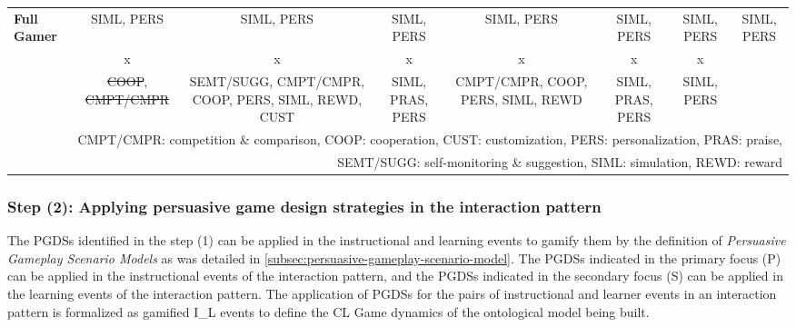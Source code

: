 \begin{landscape}
\begin{tabular}{|l|c|c|c|c|c|c|c|}
\multirow{3}{*}{\textbf{Full Gamer}}& 
\multicolumn{1}{|p{2.5cm}|}{\centering SIML, PERS}&%
\multicolumn{1}{|p{2.5cm}|}{\centering SIML, PERS}&%
\multicolumn{1}{|p{2.5cm}|}{\centering SIML, PERS}&%
\multicolumn{1}{|p{2.5cm}|}{\centering SIML, PERS}&%
\multicolumn{1}{|p{2.5cm}|}{\centering SIML, PERS}&%
\multicolumn{1}{|p{2.5cm}|}{\centering SIML, PERS}&%
\multicolumn{1}{|p{2.5cm}|}{\centering SIML, PERS}\tabularnewline
& 
\multicolumn{1}{|p{2.5cm}|}{\centering x}&
\multicolumn{1}{|p{2.5cm}|}{\centering x}&
\multicolumn{1}{|p{2.5cm}|}{\centering x}&
\multicolumn{1}{|p{2.5cm}|}{\centering x}&
\multicolumn{1}{|p{2.5cm}|}{\centering x}&
\multicolumn{1}{|p{2.5cm}|}{\centering x}&
\tabularnewline
& 
\multicolumn{1}{|p{2.5cm}|}{\centering \st{COOP}, \st{CMPT/CMPR}}&%
\multicolumn{1}{|p{2.5cm}|}{\centering \mbox{SEMT/SUGG}, \mbox{CMPT/CMPR}, COOP, PERS, SIML, REWD, CUST}&%
\multicolumn{1}{|p{2.5cm}|}{\centering SIML, PRAS, PERS}&%
\multicolumn{1}{|p{2.5cm}|}{\centering CMPT/CMPR, COOP, PERS, SIML, REWD}&%
\multicolumn{1}{|p{2.5cm}|}{\centering SIML, PRAS, PERS}&%
\multicolumn{1}{|p{2.5cm}|}{\centering SIML, PERS}&%
\tabularnewline
\hline
\multicolumn{8}{r}{CMPT/CMPR: competition \& comparison, COOP: cooperation, CUST: customization, PERS: personalization, PRAS: praise,}\tabularnewline
\multicolumn{8}{r}{SEMT/SUGG: self-monitoring \& suggestion, SIML: simulation, REWD: reward}
\end{tabular}


\end{landscape}

\subsubsection*{Step (2): Applying persuasive game design strategies in the interaction pattern}

The PGDSs identified in the step (1) can be applied in the instructional and learning events to gamify them by the definition of \emph{Persuasive Gameplay Scenario Models} as was detailed in \autoref{subsec:persuasive-gameplay-scenario-model}.
The PGDSs indicated in the primary focus (P) can be applied in the instructional events of the interaction pattern, and the PGDSs indicated in the secondary focus (S) can be applied in the learning events of the interaction pattern.
The application of PGDSs for the pairs of instructional and learner events in an interaction pattern is formalized as gamified I\_L events to define the CL Game dynamics of the ontological model being built.

